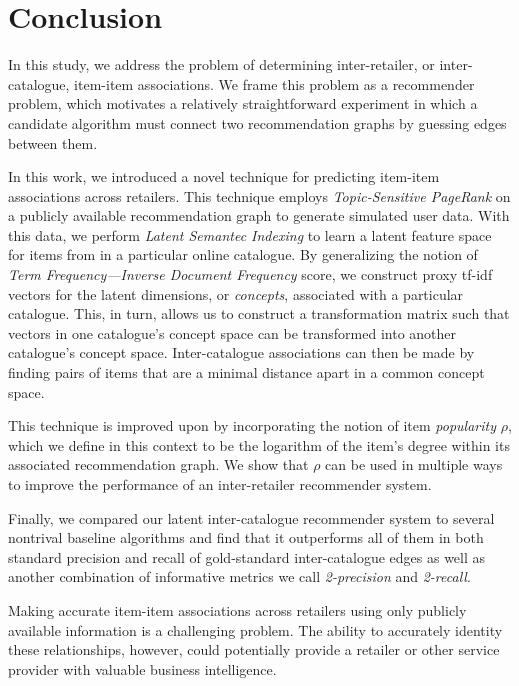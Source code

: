 \documentclass[11pt]{article}
\begin{document}
\section*{Conclusion}
In this study, we address the problem of determining inter-retailer, or
inter-catalogue, item-item associations. We frame this problem as a recommender
problem, which motivates a relatively straightforward experiment in which a
candidate algorithm must connect two recommendation graphs by guessing edges
between them.

In this work, we introduced a novel technique for predicting item-item
associations across retailers. This technique employs {\em Topic-Sensitive
PageRank} on a publicly available recommendation graph to generate simulated
user data. With this data, we perform {\em Latent Semantec Indexing} to learn a
latent feature space for items from in a particular online catalogue. By
generalizing the notion of {\em Term Frequency---Inverse Document Frequency}
score, we construct proxy tf-idf vectors for the latent dimensions, or {\em
concepts}, associated with a particular catalogue. This, in turn, allows us to
construct a transformation matrix such that vectors in one catalogue's concept
space can be transformed into another catalogue's concept space. Inter-catalogue
associations can then be made by finding pairs of items that are a minimal
distance apart in a common concept space.

This technique is improved upon by incorporating the notion of item {\em
popularity} $\rho$, which we define in this context to be the logarithm of the
item's degree within its associated recommendation graph. We show that $\rho$
can be used in multiple ways to improve the performance of an inter-retailer
recommender system.

Finally, we compared our latent inter-catalogue recommender system to several
nontrival baseline algorithms and find that it outperforms all of them in both
standard precision and recall of gold-standard inter-catalogue edges as well as
another combination of informative metrics we call {\em 2-precision} and {\em
2-recall}.

Making accurate item-item associations across retailers using only publicly
available information is a challenging problem. The ability to accurately
identity these relationships, however, could potentially provide a retailer or
other service provider with valuable business intelligence. 
\end{document}
